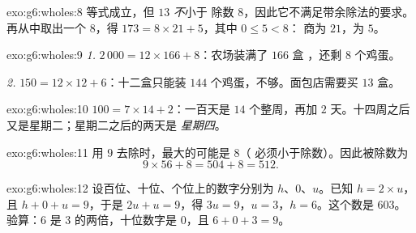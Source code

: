 \begin{solution}{exo:g6:wholes:8}
等式成立，但 $13$ \emph{不}小于
除数 $8$，因此它不满足带余除法的要求。再从中取出一个
$8$，得 $173 = 8 \times 21 + 5$，其中 $0 \leq 5 < 8$：
商为 $21$，为 $5$。
\end{solution}

\begin{solution}{exo:g6:wholes:9}
\emph{1.} $2\,000 = 12 \times 166 + 8$：农场装满了 $166$ 盒
，还剩 $8$ 个鸡蛋。

\emph{2.} $150 = 12 \times 12 + 6$：十二盒只能装 $144$
个鸡蛋，不够。面包店需要买 $13$ 盒。
\end{solution}

\begin{solution}{exo:g6:wholes:10}
$100 = 7 \times 14 + 2$：一百天是 $14$ 个整周，再加 $2$
天。十四周之后又是星期二；星期二之后的两天是
\emph{星期四}。
\end{solution}

\begin{solution}{exo:g6:wholes:11}
用 $9$ 去除时，最大的可能是 $8$（
必须小于除数）。因此被除数为
\[
9 \times 56 + 8 = 504 + 8 = 512 .
\]
\end{solution}

\begin{solution}{exo:g6:wholes:12}
设百位、十位、个位上的数字分别为 $h$、$0$、$u$。已知
$h = 2 \times u$，且 $h + 0 + u = 9$，于是 $2u + u = 9$，得
$3u = 9$，$u = 3$，$h = 6$。这个数是 $603$。验算：$6$ 是
$3$ 的两倍，十位数字是 $0$，且 $6 + 0 + 3 = 9$。
\end{solution}

